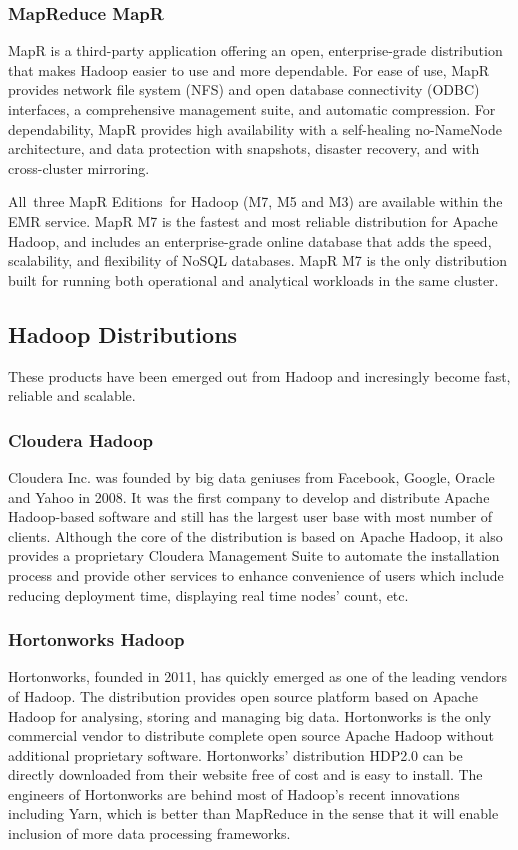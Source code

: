 \subsubsection{MapReduce MapR}
MapR is a third-party application offering an open, enterprise-grade distribution that makes Hadoop easier to use and more dependable. For ease of use, MapR provides network file system (NFS) and open database connectivity (ODBC) interfaces, a comprehensive management suite, and automatic compression. For dependability, MapR provides high availability with a self-healing no-NameNode architecture, and data protection with snapshots, disaster recovery, and with cross-cluster mirroring.

All three MapR Editions for Hadoop (M7, M5 and M3) are available within the EMR service.
MapR M7 is the fastest and most reliable distribution for Apache Hadoop, and includes an enterprise-grade online database that adds the speed, scalability, and flexibility of NoSQL databases. MapR M7 is the only distribution built for running both operational and analytical workloads in the same cluster.

\subsection{Hadoop Distributions}
These products have been emerged out from Hadoop and incresingly become fast, reliable and scalable.

\subsubsection{Cloudera Hadoop}
Cloudera Inc. was founded by big data geniuses from Facebook, Google, Oracle and Yahoo in 2008. It was the first company to develop and distribute Apache Hadoop-based software and still has the largest user base with most number of clients. Although the core of the distribution is based on Apache Hadoop, it also provides a proprietary Cloudera Management Suite to automate the installation process and provide other services to enhance convenience of users which include reducing deployment time, displaying real time nodes’ count, etc.

\subsubsection{Hortonworks Hadoop}
Hortonworks, founded in 2011, has quickly emerged as one of the leading vendors of Hadoop. The distribution provides open source platform based on Apache Hadoop for analysing, storing and managing big data. Hortonworks is the only commercial vendor to distribute complete open source Apache Hadoop without additional proprietary software. Hortonworks’ distribution HDP2.0 can be directly downloaded from their website free of cost and is easy to install. The engineers of Hortonworks are behind most of Hadoop’s recent innovations including Yarn, which is better than MapReduce in the sense that it will enable inclusion of more data processing frameworks.

